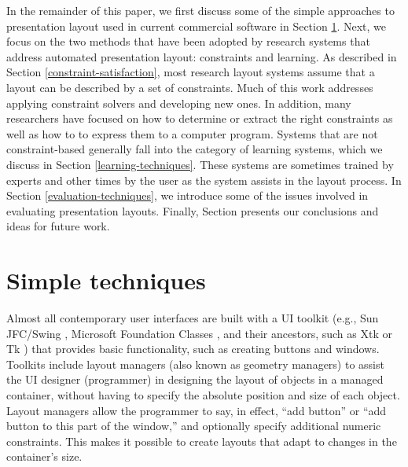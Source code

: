 
    In the remainder of this paper, we first discuss some of the simple approaches to presentation layout used in current commercial software in Section \ref{simple-techniques}. Next, we focus on the two methods that have been adopted by research systems that address automated presentation layout: constraints and learning. As described in Section \ref{constraint-satisfaction}, most research layout systems assume that a layout can be described by a set of constraints. Much of this work addresses applying constraint solvers and developing new ones. In addition, many researchers have focused on how to determine or extract the right constraints as well as how to to express them to a computer program. Systems that are not constraint-based generally fall into the category of learning systems, which we discuss in Section \ref{learning-techniques}. These systems are sometimes trained by experts and other times by the user as the system assists in the layout process. In Section \ref{evaluation-techniques}, we introduce some of the issues involved in evaluating presentation layouts. Finally, Section \label{conclusions-layout-paper} presents our conclusions and ideas for future work.

    \section{Simple techniques}
		\label{simple-techniques}

    Almost all contemporary user interfaces are built with a UI toolkit (e.g., Sun JFC/Swing \citep{sun-1}, Microsoft Foundation Classes \citep{microsoft-1}, and their ancestors, such as Xtk \citep{mccormack-1} or Tk \citep{ousterhout-1}) that provides basic functionality, such as creating buttons and windows. Toolkits include layout managers (also known as geometry managers) to assist the UI designer (programmer) in designing the layout of objects in a managed container, without having to specify the absolute position and size of each object. Layout managers allow the programmer to say, in effect, “add button” or “add button to this part of the window,” and optionally specify additional numeric constraints. This makes it possible to create layouts that adapt to changes in the container’s size.


